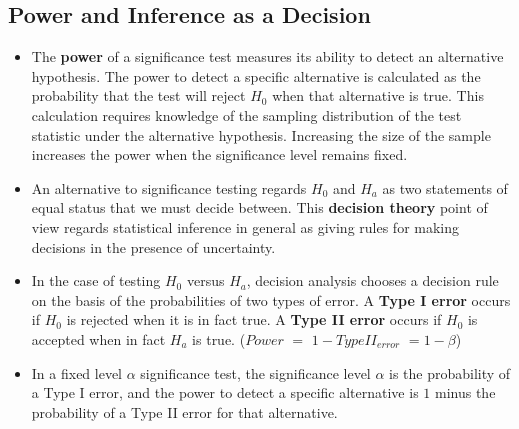 	\subsection{Power and Inference as a Decision}
		\begin{itemize}
			\item The \textbf{power} of a significance test measures its ability to detect an alternative hypothesis. The power to detect a specific alternative is calculated as the probability that the test will reject $H_0$ when that alternative is true. This calculation requires knowledge of the sampling distribution of the test statistic under the alternative hypothesis. Increasing the size of the sample increases the power when the significance level remains fixed.
			
			\item An alternative to significance testing regards $H_0$ and $H_a$ as two statements of equal status that we must decide between. This \textbf{decision theory} point of view regards statistical inference in general as giving rules for making decisions in the presence of uncertainty.
			
			\item In the case of testing $H_0$ versus $H_a$, decision analysis chooses a decision rule on the basis of the probabilities of two types of error. A \textbf{Type I error} occurs if $H_0$ is rejected when it is in fact true. A \textbf{Type II error} occurs if $H_0$ is accepted when in fact $H_a$ is true. ($Power$ $=$ $1- TypeII_{error}$ $=1-\beta$)
			
			\item In a fixed level $\alpha$ significance test, the significance level $\alpha$ is the probability of a Type I error, and the power to detect a specific alternative is $1$ minus the probability of a Type II error for that alternative.
		\end{itemize}